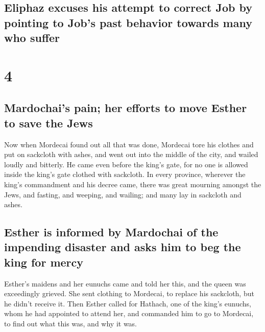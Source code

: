 \hypertarget{eliphaz-excuses-his-attempt-to-correct-job-by-pointing-to-jobs-past-behavior-towards-many-who-suffer}{%
\subsection{Eliphaz excuses his attempt to correct Job by pointing to
Job's past behavior towards many who
suffer}\label{eliphaz-excuses-his-attempt-to-correct-job-by-pointing-to-jobs-past-behavior-towards-many-who-suffer}}

\hypertarget{section-3}{%
\section{4}\label{section-3}}

\hypertarget{mardochais-pain-her-efforts-to-move-esther-to-save-the-jews}{%
\subsection{Mardochai's pain; her efforts to move Esther to save the
Jews}\label{mardochais-pain-her-efforts-to-move-esther-to-save-the-jews}}

 Now when Mordecai found out all that was done, Mordecai
tore his clothes and put on sackcloth with ashes, and went out into the
middle of the city, and wailed loudly and bitterly.  He
came even before the king's gate, for no one is allowed inside the
king's gate clothed with sackcloth.  In every province,
wherever the king's commandment and his decree came, there was great
mourning amongst the Jews, and fasting, and weeping, and wailing; and
many lay in sackcloth and ashes.

\hypertarget{esther-is-informed-by-mardochai-of-the-impending-disaster-and-asks-him-to-beg-the-king-for-mercy}{%
\subsection{Esther is informed by Mardochai of the impending disaster
and asks him to beg the king for
mercy}\label{esther-is-informed-by-mardochai-of-the-impending-disaster-and-asks-him-to-beg-the-king-for-mercy}}

 Esther's maidens and her eunuchs came and told her this,
and the queen was exceedingly grieved. She sent clothing to Mordecai, to
replace his sackcloth, but he didn't receive it.  Then
Esther called for Hathach, one of the king's eunuchs, whom he had
appointed to attend her, and commanded him to go to Mordecai, to find
out what this was, and why it was.


